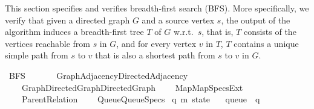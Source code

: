 %
\begin{isabellebody}%
%
%
\isadelimdocument
%
\endisadelimdocument
%
\isatagdocument
%
\isamarkuptrue%
%
\endisatagdocument
{\isafolddocument}%
%
\isadelimdocument
%
\endisadelimdocument
%
\begin{isamarkuptext}%
This section specifies and verifies breadth-first search (BFS). More specifically, we verify that
given a directed graph $G$ and a source vertex $s$, the output of the algorithm induces a
breadth-first tree $T$ of $G$ w.r.t.\ $s$, that is, $T$ consists of the vertices reachable from $s$
in $G$, and for every vertex $v$ in $T$, $T$ contains a unique simple path from $s$ to $v$ that is
also a shortest path from $s$ to $v$ in $G$.%
\end{isamarkuptext}\isamarkuptrue%
%
\isadelimtheory
%
\endisadelimtheory
%
\isatagtheory
{}\isamarkupfalse%
\ BFS\isanewline
\ \ \isanewline
\ \ \ \ {\isachardoublequoteopen}{\isachardot}{\kern0pt}{\isachardot}{\kern0pt}{\isacharslash}{\kern0pt}Graph{\isacharslash}{\kern0pt}Adjacency{\isacharslash}{\kern0pt}Directed{\isacharunderscore}{\kern0pt}Adjacency{\isachardoublequoteclose}\isanewline
\ \ \ \ {\isachardoublequoteopen}{\isachardot}{\kern0pt}{\isachardot}{\kern0pt}{\isacharslash}{\kern0pt}Graph{\isacharslash}{\kern0pt}Directed{\isacharunderscore}{\kern0pt}Graph{\isacharslash}{\kern0pt}Directed{\isacharunderscore}{\kern0pt}Graph{\isachardoublequoteclose}\isanewline
\ \ \ \ {\isachardoublequoteopen}{\isachardot}{\kern0pt}{\isachardot}{\kern0pt}{\isacharslash}{\kern0pt}Map{\isacharslash}{\kern0pt}Map{\isacharunderscore}{\kern0pt}Specs{\isacharunderscore}{\kern0pt}Ext{\isachardoublequoteclose}\isanewline
\ \ \ \ Parent{\isacharunderscore}{\kern0pt}Relation\isanewline
\ \ \ \ {\isachardoublequoteopen}{\isachardot}{\kern0pt}{\isachardot}{\kern0pt}{\isacharslash}{\kern0pt}Queue{\isacharslash}{\kern0pt}Queue{\isacharunderscore}{\kern0pt}Specs{\isachardoublequoteclose}\isanewline
{}%
\endisatagtheory
{\isafoldtheory}%
%
\isadelimtheory
%
\endisadelimtheory
%
\isadelimdocument
%
\endisadelimdocument
%
\isatagdocument
%
\isamarkuptrue%
%
\endisatagdocument
{\isafolddocument}%
%
\isadelimdocument
%
\endisadelimdocument
{}\isamarkupfalse%
\ {\isacharparenleft}{\kern0pt}{\isacharprime}{\kern0pt}q{\isacharcomma}{\kern0pt}\ {\isacharprime}{\kern0pt}m{\isacharparenright}{\kern0pt}\ state\ {\isacharequal}{\kern0pt}\isanewline
\ \ queue\ {\isacharcolon}{\kern0pt}{\isacharcolon}{\kern0pt}\ {\isacharprime}{\kern0pt}q\isanewline

\end{isabellebody}
